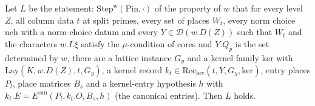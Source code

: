 \begin{proposition}\label{pf:baselat1:latlayer}
Let $L$ be the statement: $\mathrm{Step}^{\mathrm w}(\mathrm{Pin},\cdot)$ of the property of $w$ that for every level $Z$,
all column data $t$ at split primes, every set of places $W_t$, every norm choice $\mathrm{nch}$ with a norm-choice datum
and every $Y\in\mathcal D(w.D(Z))$ such that $W_t$ and the characters $w.I.\xi$ satisfy the $\mu$-condition of cores and
$Y.Q_p$ is the set determined by $w$, there are a lattice instance $G_y$ and a kernel family $\mathrm{ker}$ with
$\mathrm{Lay}(K,w.D(Z),t,G_y)$, a kernel record $k_t\in\mathrm{Rec}_{\ker}(t,Y,G_y,\mathrm{ker})$, entry places $P_l$, place
matrices $B_s$ and a kernel-entry hypothesis $h$ with $k_t.E=E^{\mathrm{can}}(P_l,k_t.O,B_s,h)$ (the canonical
entries). Then $L$ holds.
\end{proposition}

